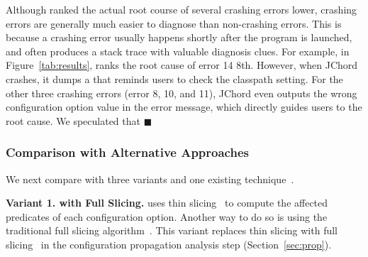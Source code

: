 Although \ourtool ranked the actual root course of several
crashing errors lower, crashing errors are generally much easier to diagnose than non-crashing errors.
This is because a crashing error usually happens shortly after the program
is launched, and often produces a stack trace with valuable diagnosis clues.
For example, in Figure~\ref{tab:results}, \ourtool ranks the root cause of
error 14  8th.
However, when JChord crashes, it dumps a 
that reminds users to check the classpath setting. For the other three crashing errors (error 8, 10, and 11),
JChord even outputs the wrong configuration option value in the
error message, which
directly guides users to the root cause. We speculated that $\blacksquare$









\subsubsection{Comparison with Alternative Approaches}
\label{sec:comparison}

We next compare \ourtool with three variants and
one existing technique~\cite{Rabkin:2011:PPC}.

\vspace{1mm}
\noindent \textbf{Variant 1. \ourtool with Full Slicing.} 
\ourtool uses thin slicing~\cite{Sridharan:2007} to compute the affected predicates
of each configuration option. Another way to do so is
using the traditional full slicing algorithm~\cite{Horwitz:1988}.
This variant replaces thin slicing with 
full slicing~\cite{Horwitz:1988} in the configuration
propagation analysis step (Section~\ref{sec:prop}).


